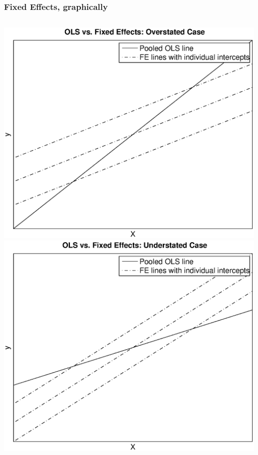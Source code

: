 \documentclass[english,xcolor=dvipsnames]{beamer}
\begin{document}
\begin{frame}
\frametitle{Fixed Effects, graphically}
\begin{columns}[c]
\column{3in}
\includegraphics[scale=0.40]{FE_figure1.eps}
\column{3in}
\includegraphics[scale=0.40]{FE_figure2.eps}
\end{columns}
\end{frame}
\end{document}
